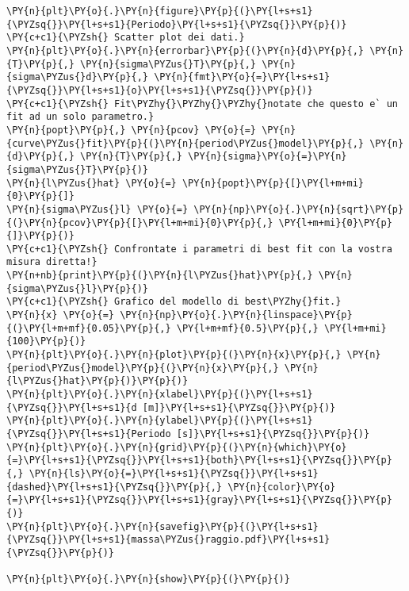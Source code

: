 \begin{Verbatim}[label=\makebox{\href{https://github.com/unipi-physics-labs/lab1-sheets/tree/main/snippy/pendolo_fisico.py}{https://github.com/.../pendolo\_fisico.py}},commandchars=\\\{\}]
\PY{n}{plt}\PY{o}{.}\PY{n}{figure}\PY{p}{(}\PY{l+s+s1}{\PYZsq{}}\PY{l+s+s1}{Periodo}\PY{l+s+s1}{\PYZsq{}}\PY{p}{)}
\PY{c+c1}{\PYZsh{} Scatter plot dei dati.}
\PY{n}{plt}\PY{o}{.}\PY{n}{errorbar}\PY{p}{(}\PY{n}{d}\PY{p}{,} \PY{n}{T}\PY{p}{,} \PY{n}{sigma\PYZus{}T}\PY{p}{,} \PY{n}{sigma\PYZus{}d}\PY{p}{,} \PY{n}{fmt}\PY{o}{=}\PY{l+s+s1}{\PYZsq{}}\PY{l+s+s1}{o}\PY{l+s+s1}{\PYZsq{}}\PY{p}{)}
\PY{c+c1}{\PYZsh{} Fit\PYZhy{}\PYZhy{}\PYZhy{}notate che questo e` un fit ad un solo parametro.}
\PY{n}{popt}\PY{p}{,} \PY{n}{pcov} \PY{o}{=} \PY{n}{curve\PYZus{}fit}\PY{p}{(}\PY{n}{period\PYZus{}model}\PY{p}{,} \PY{n}{d}\PY{p}{,} \PY{n}{T}\PY{p}{,} \PY{n}{sigma}\PY{o}{=}\PY{n}{sigma\PYZus{}T}\PY{p}{)}
\PY{n}{l\PYZus{}hat} \PY{o}{=} \PY{n}{popt}\PY{p}{[}\PY{l+m+mi}{0}\PY{p}{]}
\PY{n}{sigma\PYZus{}l} \PY{o}{=} \PY{n}{np}\PY{o}{.}\PY{n}{sqrt}\PY{p}{(}\PY{n}{pcov}\PY{p}{[}\PY{l+m+mi}{0}\PY{p}{,} \PY{l+m+mi}{0}\PY{p}{]}\PY{p}{)}
\PY{c+c1}{\PYZsh{} Confrontate i parametri di best fit con la vostra misura diretta!}
\PY{n+nb}{print}\PY{p}{(}\PY{n}{l\PYZus{}hat}\PY{p}{,} \PY{n}{sigma\PYZus{}l}\PY{p}{)}
\PY{c+c1}{\PYZsh{} Grafico del modello di best\PYZhy{}fit.}
\PY{n}{x} \PY{o}{=} \PY{n}{np}\PY{o}{.}\PY{n}{linspace}\PY{p}{(}\PY{l+m+mf}{0.05}\PY{p}{,} \PY{l+m+mf}{0.5}\PY{p}{,} \PY{l+m+mi}{100}\PY{p}{)}
\PY{n}{plt}\PY{o}{.}\PY{n}{plot}\PY{p}{(}\PY{n}{x}\PY{p}{,} \PY{n}{period\PYZus{}model}\PY{p}{(}\PY{n}{x}\PY{p}{,} \PY{n}{l\PYZus{}hat}\PY{p}{)}\PY{p}{)}
\PY{n}{plt}\PY{o}{.}\PY{n}{xlabel}\PY{p}{(}\PY{l+s+s1}{\PYZsq{}}\PY{l+s+s1}{d [m]}\PY{l+s+s1}{\PYZsq{}}\PY{p}{)}
\PY{n}{plt}\PY{o}{.}\PY{n}{ylabel}\PY{p}{(}\PY{l+s+s1}{\PYZsq{}}\PY{l+s+s1}{Periodo [s]}\PY{l+s+s1}{\PYZsq{}}\PY{p}{)}
\PY{n}{plt}\PY{o}{.}\PY{n}{grid}\PY{p}{(}\PY{n}{which}\PY{o}{=}\PY{l+s+s1}{\PYZsq{}}\PY{l+s+s1}{both}\PY{l+s+s1}{\PYZsq{}}\PY{p}{,} \PY{n}{ls}\PY{o}{=}\PY{l+s+s1}{\PYZsq{}}\PY{l+s+s1}{dashed}\PY{l+s+s1}{\PYZsq{}}\PY{p}{,} \PY{n}{color}\PY{o}{=}\PY{l+s+s1}{\PYZsq{}}\PY{l+s+s1}{gray}\PY{l+s+s1}{\PYZsq{}}\PY{p}{)}
\PY{n}{plt}\PY{o}{.}\PY{n}{savefig}\PY{p}{(}\PY{l+s+s1}{\PYZsq{}}\PY{l+s+s1}{massa\PYZus{}raggio.pdf}\PY{l+s+s1}{\PYZsq{}}\PY{p}{)}

\PY{n}{plt}\PY{o}{.}\PY{n}{show}\PY{p}{(}\PY{p}{)}
\end{Verbatim}
